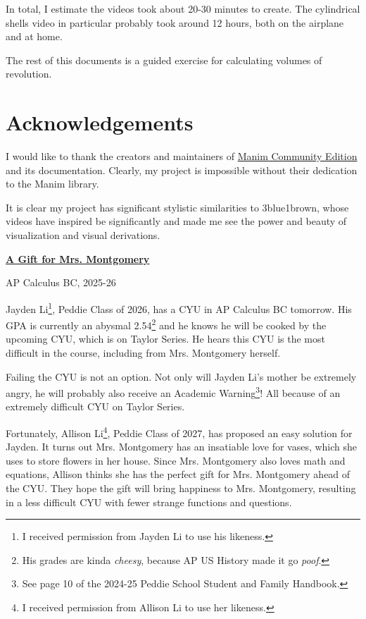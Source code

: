 \documentclass{article}
\begin{document}
In total, I estimate the videos took about 20-30 minutes to create. The cylindrical shells video in particular probably took around 12 hours, both on the airplane and at home.

The rest of this documents is a guided exercise for calculating volumes of revolution.

\section{Acknowledgements}

I would like to thank the creators and maintainers of \href{https://www.manim.community/}{Manim Community Edition} and its documentation. Clearly, my project is impossible without their dedication to the Manim library.

It is clear my project has significant stylistic similarities to 3blue1brown, whose videos have inspired be significantly and made me see the power and beauty of visualization and visual derivations.

\newpage

\begin{center}
	\textbf{\underline{A Gift for Mrs. Montgomery}}

	AP Calculus BC, 2025-26
\end{center}

Jayden Li\footnote{I received permission from Jayden Li to use his likeness.}, Peddie Class of 2026, has a CYU in AP Calculus BC tomorrow. His GPA is currently an abysmal 2.54\footnote{His grades are kinda \textit{cheesy}, because AP US History made it go \textit{poof}.} and he knows he will be cooked by the upcoming CYU, which is on Taylor Series. He hears this CYU is the most difficult in the course, including from Mrs. Montgomery herself.

Failing the CYU is not an option. Not only will Jayden Li's mother be extremely angry, he will probably also receive an Academic Warning\footnote{See page 10 of the 2024-25 Peddie School Student and Family Handbook.}! All because of an extremely difficult CYU on Taylor Series.

Fortunately, Allison Li\footnote{I received permission from Allison Li to use her likeness.}, Peddie Class of 2027, has proposed an easy solution for Jayden. It turns out Mrs. Montgomery has an insatiable love for vases, which she uses to store flowers in her house. Since Mrs. Montgomery also loves math and equations, Allison thinks she has the perfect gift for Mrs. Montgomery ahead of the CYU. They hope the gift will bring happiness to Mrs. Montgomery, resulting in a less difficult CYU with fewer strange functions and questions.
\end{document}
